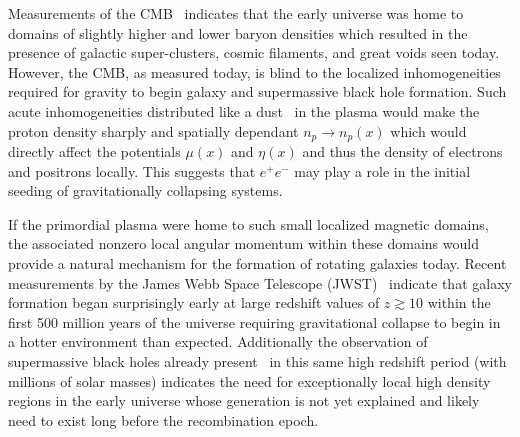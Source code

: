 \documentclass[reprint]{revtex4-2}
\begin{document}
Measurements of the CMB~\cite{aghanim2018planck} indicates that the early universe was home to domains of slightly higher and lower baryon densities which resulted in the presence of galactic super-clusters, cosmic filaments, and great voids seen today. However, the CMB, as measured today, is blind to the localized inhomogeneities required for gravity to begin galaxy and supermassive black hole formation. Such acute inhomogeneities distributed like a dust~\cite{grayson2023electron} in the plasma would make the proton density sharply and spatially dependant $n_{p}\rightarrow n_{p}(x)$ which would directly affect the potentials $\mu(x)$ and $\eta(x)$ and thus the density of electrons and positrons locally. This suggests that $e^{+}e^{-}$ may play a role in the initial seeding of gravitationally collapsing systems.

If the primordial plasma were home to such small localized magnetic domains, the associated nonzero local angular momentum within these domains would provide a natural mechanism for the formation of rotating galaxies today. Recent measurements by the James Webb Space Telescope (JWST)~\cite{yan2022first,adams2023discovery,arrabal2023spectroscopic} indicate that galaxy formation began surprisingly early at large redshift values of $z\gtrsim10$ within the first 500 million years of the universe requiring gravitational collapse to begin in a hotter environment than expected. Additionally the observation of supermassive black holes already present~\cite{larson2023ceers} in this same high redshift period (with millions of solar masses) indicates the need for exceptionally local high density regions in the early universe whose generation is not yet explained and likely need to exist long before the recombination epoch.


\end{document}
